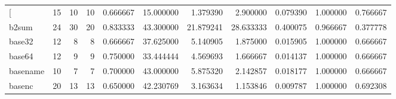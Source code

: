 \begin{longtable}{lrrrrrrrrrr}
\bottomrule
\endlastfoot
{[}         &                                      15 &                 10 &                                10 &                                   0.666667 &                              15.000000 &                                     1.379390 &                          2.900000 &                                0.079390 &                           1.000000 &                                           0.766667 \\
b2sum     &                                      24 &                 30 &                                20 &                                   0.833333 &                              43.300000 &                                    21.879241 &                         28.633333 &                                0.400075 &                           0.966667 &                                           0.377778 \\
base32    &                                      12 &                  8 &                                 8 &                                   0.666667 &                              37.625000 &                                     5.140905 &                          1.875000 &                                0.015905 &                           1.000000 &                                           0.666667 \\
base64    &                                      12 &                  9 &                                 9 &                                   0.750000 &                              33.444444 &                                     4.569693 &                          1.666667 &                                0.014137 &                           1.000000 &                                           0.666667 \\
basename  &                                      10 &                  7 &                                 7 &                                   0.700000 &                              43.000000 &                                     5.875320 &                          2.142857 &                                0.018177 &                           1.000000 &                                           0.666667 \\
basenc    &                                      20 &                 13 &                                13 &                                   0.650000 &                              42.230769 &                                     3.163634 &                          1.153846 &                                0.009787 &                           1.000000 &                                           0.692308 \\

\end{longtable}

